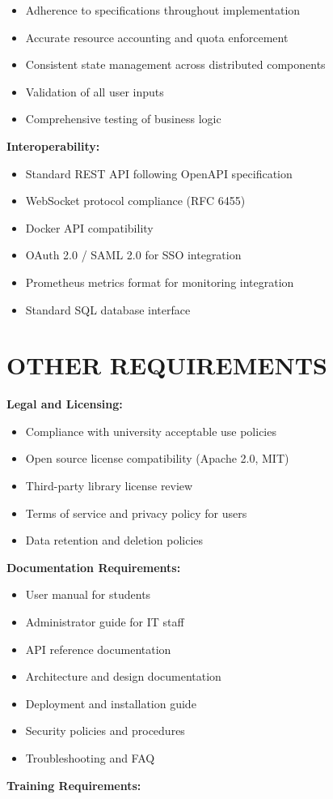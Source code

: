 \documentclass[12pt,a4paper]{article}
\begin{document}
\begin{itemize}
    \item Adherence to specifications throughout implementation
    \item Accurate resource accounting and quota enforcement
    \item Consistent state management across distributed components
    \item Validation of all user inputs
    \item Comprehensive testing of business logic
\end{itemize}

\textbf{Interoperability:}

\begin{itemize}
    \item Standard REST API following OpenAPI specification
    \item WebSocket protocol compliance (RFC 6455)
    \item Docker API compatibility
    \item OAuth 2.0 / SAML 2.0 for SSO integration
    \item Prometheus metrics format for monitoring integration
    \item Standard SQL database interface
\end{itemize}

\newpage

\section{OTHER REQUIREMENTS}
\label{sec:other}

\textbf{Legal and Licensing:}

\begin{itemize}
    \item Compliance with university acceptable use policies
    \item Open source license compatibility (Apache 2.0, MIT)
    \item Third-party library license review
    \item Terms of service and privacy policy for users
    \item Data retention and deletion policies
\end{itemize}

\textbf{Documentation Requirements:}

\begin{itemize}
    \item User manual for students
    \item Administrator guide for IT staff
    \item API reference documentation
    \item Architecture and design documentation
    \item Deployment and installation guide
    \item Security policies and procedures
    \item Troubleshooting and FAQ
\end{itemize}
\textbf{Training Requirements:}
\end{document}
